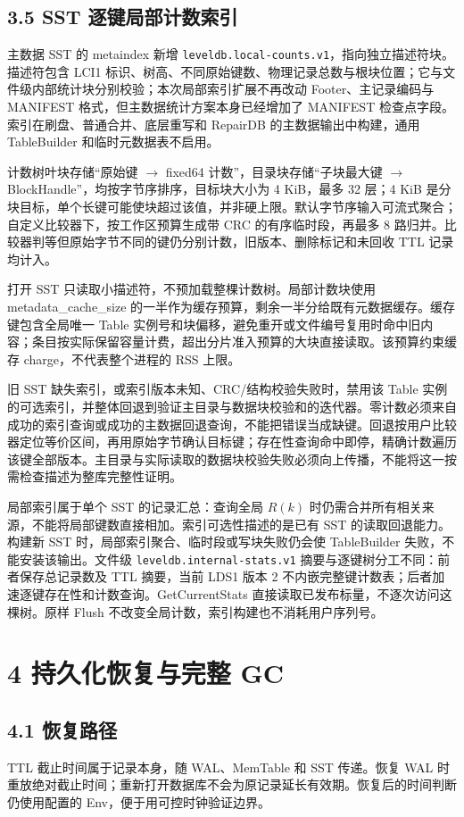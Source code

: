 \documentclass[UTF8,a4paper,10pt,twocolumn,fontset=fandol]{ctexart}
\begin{document}
\subsection*{3.5 SST 逐键局部计数索引}
主数据 SST 的 metaindex 新增 \texttt{leveldb.local-counts.v1}，指向独立描述符块。描述符包含 LCI1 标识、树高、不同原始键数、物理记录总数与根块位置；它与文件级内部统计块分别校验；本次局部索引扩展不再改动 Footer、主记录编码与 MANIFEST 格式，但主数据统计方案本身已经增加了 MANIFEST 检查点字段。索引在刷盘、普通合并、底层重写和 RepairDB 的主数据输出中构建，通用 TableBuilder 和临时元数据表不启用。

计数树叶块存储“原始键 $\rightarrow$ fixed64 计数”，目录块存储“子块最大键 $\rightarrow$ BlockHandle”，均按字节序排序，目标块大小为 4 KiB，最多 32 层；4 KiB 是分块目标，单个长键可能使块超过该值，并非硬上限。默认字节序输入可流式聚合；自定义比较器下，按工作区预算生成带 CRC 的有序临时段，再最多 8 路归并。比较器判等但原始字节不同的键仍分别计数，旧版本、删除标记和未回收 TTL 记录均计入。

打开 SST 只读取小描述符，不预加载整棵计数树。局部计数块使用 metadata\_cache\_size 的一半作为缓存预算，剩余一半分给既有元数据缓存。缓存键包含全局唯一 Table 实例号和块偏移，避免重开或文件编号复用时命中旧内容；条目按实际保留容量计费，超出分片准入预算的大块直接读取。该预算约束缓存 charge，不代表整个进程的 RSS 上限。

旧 SST 缺失索引，或索引版本未知、CRC/结构校验失败时，禁用该 Table 实例的可选索引，并整体回退到验证主目录与数据块校验和的迭代器。零计数必须来自成功的索引查询或成功的主数据回退查询，不能把错误当成缺键。回退按用户比较器定位等价区间，再用原始字节确认目标键；存在性查询命中即停，精确计数遍历该键全部版本。主目录与实际读取的数据块校验失败必须向上传播，不能将这一按需检查描述为整库完整性证明。

局部索引属于单个 SST 的记录汇总：查询全局 $R(k)$ 时仍需合并所有相关来源，不能将局部键数直接相加。索引可选性描述的是已有 SST 的读取回退能力。构建新 SST 时，局部索引聚合、临时段或写块失败仍会使 TableBuilder 失败，不能安装该输出。文件级 \texttt{leveldb.internal-stats.v1} 摘要与逐键树分工不同：前者保存总记录数及 TTL 摘要，当前 LDS1 版本 2 不内嵌完整键计数表；后者加速逐键存在性和计数查询。GetCurrentStats 直接读取已发布标量，不逐次访问这棵树。原样 Flush 不改变全局计数，索引构建也不消耗用户序列号。

\section*{4 持久化恢复与完整 GC}
\subsection*{4.1 恢复路径}
TTL 截止时间属于记录本身，随 WAL、MemTable 和 SST 传递。恢复 WAL 时重放绝对截止时间；重新打开数据库不会为原记录延长有效期。恢复后的时间判断仍使用配置的 Env，便于用可控时钟验证边界。
\end{document}
